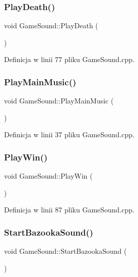 \subsubsection{\texorpdfstring{Play\+Death()}{PlayDeath()}}
{\footnotesize\ttfamily void Game\+Sound\+::\+Play\+Death (\begin{DoxyParamCaption}{ }\end{DoxyParamCaption})}



Definicja w linii 77 pliku Game\+Sound.\+cpp.

\mbox{\label{class_game_sound_ad89f0cfad75194e895cb68437f9c231f}} 
\subsubsection{\texorpdfstring{Play\+Main\+Music()}{PlayMainMusic()}}
{\footnotesize\ttfamily void Game\+Sound\+::\+Play\+Main\+Music (\begin{DoxyParamCaption}{ }\end{DoxyParamCaption})}



Definicja w linii 37 pliku Game\+Sound.\+cpp.

\mbox{\label{class_game_sound_a429befa039bfc4e9f7b33326fbb090a4}} 
\subsubsection{\texorpdfstring{Play\+Win()}{PlayWin()}}
{\footnotesize\ttfamily void Game\+Sound\+::\+Play\+Win (\begin{DoxyParamCaption}{ }\end{DoxyParamCaption})}



Definicja w linii 87 pliku Game\+Sound.\+cpp.

\mbox{\label{class_game_sound_ab3bc96f5be15c7a9be79a035ec16638c}} 
\subsubsection{\texorpdfstring{Start\+Bazooka\+Sound()}{StartBazookaSound()}}
{\footnotesize\ttfamily void Game\+Sound\+::\+Start\+Bazooka\+Sound (\begin{DoxyParamCaption}{ }\end{DoxyParamCaption})}



